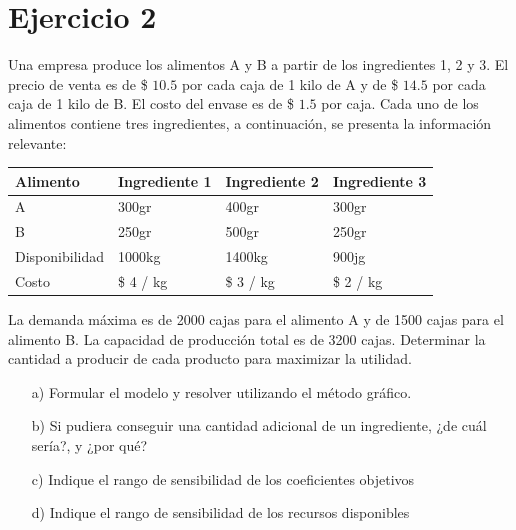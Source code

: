 \documentclass[12pt]{article}
\begin{document}
\newpage
\section*{Ejercicio 2}
\noindent Una empresa produce los alimentos A y B a partir de los ingredientes 1, 2 y 3. El precio de venta es de \$ $10.5$
por cada caja de 1 kilo de A y de \$ $14.5$ por cada caja de 1 kilo de B. El costo del envase es de \$ $1.5$ por 
caja. Cada uno de los alimentos contiene tres ingredientes, a continuación, se presenta la información relevante:

\begin{center}
\begin{tabular}{|l|l|l|l|}
  \hline
  Alimento & Ingrediente 1 & Ingrediente 2 & Ingrediente 3 \\
  \hline
  A & 300gr & 400gr & 300gr \\
  \hline
  B & 250gr & 500gr & 250gr \\
  \hline
  Disponibilidad & 1000kg & 1400kg & 900jg \\
  \hline
  Costo & \$ 4 / kg & \$ 3 / kg & \$ 2 / kg \\
  \hline
\end{tabular}
\end{center}

\noindent La demanda máxima es de 2000 cajas para el alimento A y de 1500 cajas para el alimento B. La capacidad de
producción total es de 3200 cajas. Determinar la cantidad a producir de cada producto para maximizar la utilidad.

\begin{itemize}
  \item [a)] Formular el modelo y resolver utilizando el método gráfico.
  \item [b)] Si pudiera conseguir una cantidad adicional de un ingrediente, ¿de cuál sería?, y ¿por qué?
  \item [c)] Indique el rango de sensibilidad de los coeficientes objetivos
  \item [d)] Indique el rango de sensibilidad de los recursos disponibles
\end{itemize}
\end{document}
